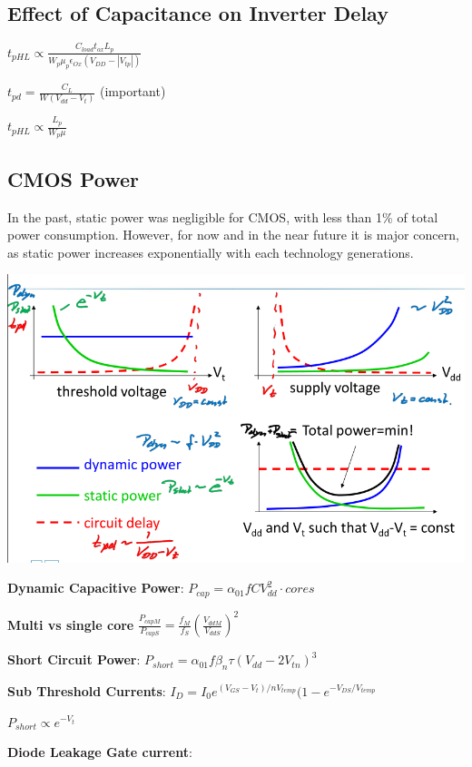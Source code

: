 \documentclass[english]{latex4ei/latex4ei_sheet}
\begin{document}
\subsection{Effect of Capacitance on Inverter Delay}
$t_{pHL} \varpropto \frac{C_{load} t_{ox} L_p}{W_p \mu_p \epsilon_{Ox} (V_{DD} - |V_{tp}|)}$

$t_{pd} = \frac{C_L}{W (V_{dd} - V_t)}$ (important)

$t_{pHL} \varpropto \frac{L_p}{W_p \mu}$

\subsection{CMOS Power}
In the past, static power was negligible for CMOS, with less than 1\% of total power consumption. However, for now and in the near future it is major concern, as static power increases exponentially with each technology generations.

\begin{center}
  \centering
  \includegraphics[width=0.8\linewidth]{assets/CMOSPower.png}
  \label{fig:cmospower}
\end{center}
\textbf{Dynamic Capacitive Power}: $P_{cap} = \alpha_{01} f C V_{dd}^2 \cdot cores$

\textbf{Multi vs single core} $\frac{P_{capM}}{P_{capS}} = \frac{f_M}{f_S} (\frac{V_{ddM}}{V_{ddS}})^2$

\textbf{Short Circuit Power}: $P_{short} = \alpha_{01} f \beta_n \tau (V_{dd} - 2 V_{tn})^3$

\textbf{Sub Threshold Currents}: $I_D = I_0 e^{(V_{GS} - V_t) / n V_{temp}} (1 - e^{-V_{DS} / V_{temp}}$

$P_{short} \varpropto e^{-V_t}$

\textbf{Diode Leakage Gate current}:

\end{document}
